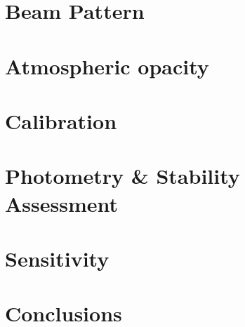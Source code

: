 \documentclass{aa}
\begin{document}
\section{Beam Pattern}
\label{se:beam}


\section{Atmospheric opacity}
\label{se:opacity}


\section{Calibration}
\label{se:calibration}
%

\section{Photometry \& Stability Assessment}
\label{se:photometry}
%

\section{Sensitivity}
\label{se:sensitivity}
%


\section{Conclusions}
\end{document}
